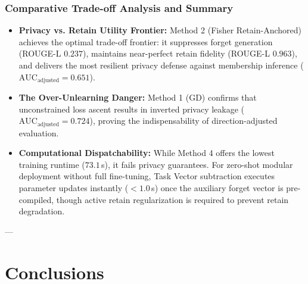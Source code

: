 \documentclass[11pt,a4paper]{article}
\begin{document}
\subsubsection{Comparative Trade-off Analysis and Summary}
\begin{itemize}
    \item \textbf{Privacy vs. Retain Utility Frontier:} Method 2 (Fisher Retain-Anchored) achieves the optimal trade-off frontier: it suppresses forget generation (ROUGE-L $0.237$), maintains near-perfect retain fidelity (ROUGE-L $0.963$), and delivers the most resilient privacy defense against membership inference ($\text{AUC}_{\text{adjusted}} = 0.651$).
    \item \textbf{The Over-Unlearning Danger:} Method 1 (GD) confirms that unconstrained loss ascent results in inverted privacy leakage ($\text{AUC}_{\text{adjusted}} = 0.724$), proving the indispensability of direction-adjusted evaluation.
    \item \textbf{Computational Dispatchability:} While Method 4 offers the lowest training runtime ($73.1$\,s), it fails privacy guarantees. For zero-shot modular deployment without full fine-tuning, Task Vector subtraction executes parameter updates instantly ($<1.0$\,s) once the auxiliary forget vector is pre-compiled, though active retain regularization is required to prevent retain degradation.
\end{itemize}

---

\section{Conclusions}
\end{document}
